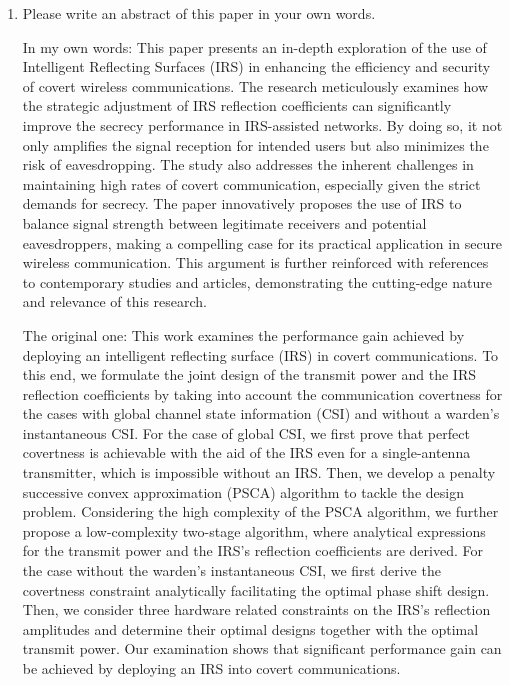 \documentclass[12pt]{article}
\begin{document}
\begin{enumerate}
\begin{enumerate}
        \item Please write an abstract of this paper in your own words.
        
        In my own words: This paper presents an in-depth exploration of the use of Intelligent Reflecting Surfaces (IRS) in enhancing the efficiency and security of covert wireless communications. The research meticulously examines how the strategic adjustment of IRS reflection coefficients can significantly improve the secrecy performance in IRS-assisted networks. By doing so, it not only amplifies the signal reception for intended users but also minimizes the risk of eavesdropping. The study also addresses the inherent challenges in maintaining high rates of covert communication, especially given the strict demands for secrecy. The paper innovatively proposes the use of IRS to balance signal strength between legitimate receivers and potential eavesdroppers, making a compelling case for its practical application in secure wireless communication. This argument is further reinforced with references to contemporary studies and articles, demonstrating the cutting-edge nature and relevance of this research.
        
        The original one: This work examines the performance gain achieved by deploying an intelligent reflecting surface (IRS) in covert communications. To this end, we formulate the joint design of the transmit power and the IRS reflection coefficients by taking into account the communication covertness for the cases with global channel state information (CSI) and without a warden’s instantaneous CSI. For the case of global CSI, we first prove that perfect covertness is achievable with the aid of the IRS even for a single-antenna transmitter, which is impossible without an IRS. Then, we develop a penalty successive convex approximation (PSCA) algorithm to tackle the design problem. Considering the high complexity of the PSCA algorithm, we further propose a low-complexity two-stage algorithm, where analytical expressions for the transmit power and the IRS’s reflection coefficients are derived. For the case without the warden’s instantaneous CSI, we first derive the covertness constraint analytically facilitating the optimal phase shift design. Then, we consider three hardware related constraints on the IRS’s reflection amplitudes and determine their optimal designs together with the optimal transmit power. Our examination shows that significant performance gain can be achieved by deploying an IRS into covert communications.
    \end{enumerate}
       
\end{enumerate}
\end{document}

